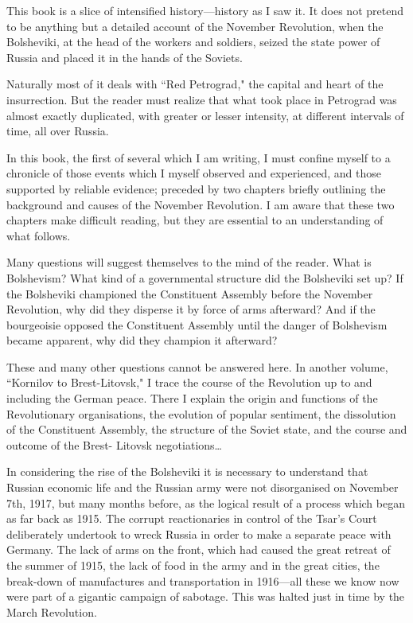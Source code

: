 This book is a slice of intensified history—history as I saw it. It does not pretend to be anything but a detailed account of the November Revolution, when the Bolsheviki, at the head of the workers and soldiers, seized the state power of Russia and placed it in the hands of the Soviets.

Naturally most of it deals with ``Red Petrograd," the capital and heart of the insurrection. But the reader must realize that what took place in Petrograd was almost exactly duplicated, with greater or lesser intensity, at different intervals of time, all over Russia.

In this book, the first of several which I am writing, I must confine myself to a chronicle of those events which I myself observed and experienced, and those supported by reliable evidence; preceded by two chapters briefly outlining the background and causes of the November Revolution. I am aware that these two chapters make difficult reading, but they are essential to an understanding of what follows.

Many questions will suggest themselves to the mind of the reader. What is Bolshevism? What kind of a governmental structure did the Bolsheviki set up? If the Bolsheviki championed the Constituent Assembly before the November Revolution, why did they disperse it by force of arms afterward? And if the bourgeoisie opposed the Constituent Assembly until the danger of Bolshevism became apparent, why did they champion it afterward?

These and many other questions cannot be answered here. In another volume, ``Kornilov to Brest-Litovsk," I trace the course of the Revolution up to and including the German peace. There I explain the origin and functions of the Revolutionary organisations, the evolution of popular sentiment, the dissolution of the Constituent Assembly, the structure of the Soviet state, and the course and outcome of the Brest- Litovsk negotiations\ldots

In considering the rise of the Bolsheviki it is necessary to understand that Russian economic life and the Russian army were not disorganised on November 7th, 1917, but many months before, as the logical result of a process which began as far back as 1915. The corrupt reactionaries in control of the Tsar’s Court deliberately undertook to wreck Russia in order to make a separate peace with Germany. The lack of arms on the front, which had caused the great retreat of the summer of 1915, the lack of food in the army and in the great cities, the break-down of manufactures and transportation in 1916—all these we know now were part of a gigantic campaign of sabotage. This was halted just in time by the March Revolution.

